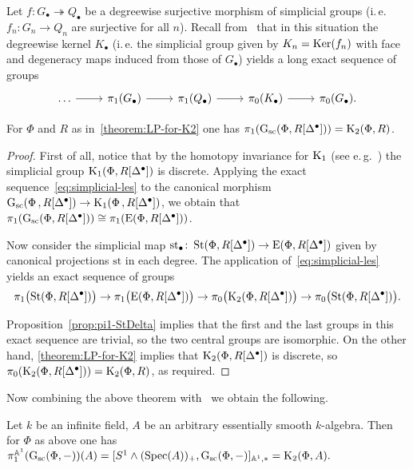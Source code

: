 \documentclass[oneside, 11pt]{amsart} \pdfoutput=1
\begin{document}
Let $f\colon G_\bullet\twoheadrightarrow Q_\bullet$ be a degreewise surjective morphism of simplicial groups (i.\,e. $f_n\colon G_n\to Q_n$ are surjective for all $n$). Recall from~\cite[Theorem~1.3]{Ina75} that in this situation the degreewise kernel $K_\bullet$ (i.\,e. the simplicial group given by $K_n = \mathop{\mathrm{Ker}}\nolimits(f_n)$ with face and degeneracy maps induced from those of $G_\bullet$) yields a long exact sequence of groups
\begin{equation} \label{eq:simplicial-les} \begin{tikzcd} \ldots \ar{r} & \pi_{1}(G_\bullet) \ar{r} & \pi_1(Q_\bullet) \ar{r} & \pi_0(K_\bullet) \ar{r} & \pi_0(G_\bullet). \end{tikzcd} \end{equation}

\begin{theorem} \label{theorem:pi1-GRDelta}
 For $\Phi$ and $R$ as in~\cref{theorem:LP-for-K2} one has $\pi_1(\mathrm{G}_\mathrm{sc}(\Phi, R[\Delta^\bullet])) = {\mathrm{K}}_2(\Phi, R)$.
\end{theorem}
\begin{proof}
First of all, notice that by the homotopy invariance for ${\mathrm{K}}_1$ (see e.\,g.~\cite[Theorem~1.3]{Sta14}) the simplicial group ${\mathrm{K}}_1(\Phi, R[\Delta^\bullet])$ is discrete. Applying the exact sequence~\eqref{eq:simplicial-les} to the canonical morphism $\mathrm{G}_\mathrm{sc}(\Phi\,,R[\Delta^\bullet]) \to {\mathrm{K}}_1(\Phi\,,R[\Delta^\bullet])$, we obtain that $\pi_1(\mathrm{G}_\mathrm{sc}(\Phi, R[\Delta^\bullet])) \cong \pi_1(\mathrm{E}(\Phi, R[\Delta^\bullet]))$.
 
Now consider the simplicial map $\mathrm{st}_\bullet \colon \mathop{\mathrm{St}}\nolimits(\Phi, R[\Delta^\bullet]) \to \mathrm{E}(\Phi, R[\Delta^\bullet])$ given by canonical projections $\mathrm{st}$ in each degree. The application of~\eqref{eq:simplicial-les} yields an exact sequence of groups
\[
\pi_1\bigl(\mathop{\mathrm{St}}\nolimits(\Phi, R[\Delta^\bullet])\bigr) \to \pi_1\bigl(\mathrm{E}(\Phi, R[\Delta^\bullet])\bigr) \to \pi_0\bigl({\mathrm{K}}_2(\Phi, R[\Delta^\bullet])\bigr) \to \pi_0\bigl(\mathop{\mathrm{St}}\nolimits(\Phi, R[\Delta^\bullet])\bigr).
\]
\iffalse \[
\begin{tikzcd} \pi_1(\St(\Phi, R[\Delta^\bullet])) \ar[r] & \pi_1(\E(\Phi, R[\Delta^\bullet])) \ar[r] & \pi_0(\K_2(\Phi, R[\Delta^\bullet])) \ar[r] & \pi_0(\St(\Phi, R[\Delta^\bullet])). \end{tikzcd}
\] \fi
 Proposition~\ref{prop:pi1-StDelta} implies that the first and the last groups in this exact sequence are trivial, so the two central groups are isomorphic. On the other hand, \cref{theorem:LP-for-K2} implies that ${\mathrm{K}}_2(\Phi, R[\Delta^\bullet])$ is discrete, so $\pi_0({\mathrm{K}}_2(\Phi, R[\Delta^\bullet])) = {\mathrm{K}}_2(\Phi, R)$, as required.
\end{proof}

Now combining the above theorem with~\cite[Theorem~4.3.1]{AHW18} we obtain the following.
\begin{corollary} \label{cor:motivic-pi1} Let $k$ be an infinite field, $A$ be an arbitrary essentially smooth $k$-algebra. Then for $\Phi$ as above one has $\pi_1^{\mathbb{A}^1}(\mathrm{G}_\mathrm{sc}(\Phi, -))(A) = [S^1 \wedge (\mathrm{Spec}(A))_+, \mathrm{G}_\mathrm{sc}(\Phi, -)]_{ \mathbb{A}^1,*} = {\mathrm{K}}_2(\Phi, A).$
\end{corollary}

\printbibliography
\end{document}
